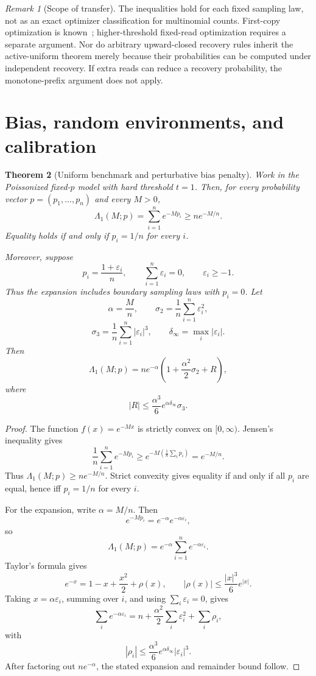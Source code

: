 \documentclass[11pt]{article}
\newtheorem{theorem}{Theorem}[section]
\theoremstyle{definition}
\theoremstyle{remark}
\newtheorem{remark}[theorem]{Remark}
\newcommand{\1}{\mathbf 1}
\begin{document}
\begin{remark}[Scope of transfer]
The inequalities hold for each fixed sampling law, not as an exact
optimizer classification for multinomial counts. First-copy
optimization is known~\cite{Anceaume2015}; higher-threshold fixed-read
optimization requires a separate argument. Nor do arbitrary
upward-closed recovery rules inherit the active-uniform theorem merely
because their probabilities can be computed under independent recovery.
If extra reads can reduce a recovery probability, the monotone-prefix
argument does not apply.
\end{remark}

\section{Bias, random environments, and calibration}
\label{sec:random-environments}
\begin{theorem}[Uniform benchmark and perturbative bias penalty]\label{thm:uniform-penalty}
Work in the Poissonized fixed-\(p\) model with hard threshold \(t=1\).  Then, for every probability vector \(p=(p_1,\ldots,p_n)\) and every \(M>0\),
\[
  \Lambda_1(M;p)=\sum_{i=1}^n e^{-Mp_i}
  \ge n e^{-M/n}.
\]
Equality holds if and only if \(p_i=1/n\) for every \(i\).

Moreover, suppose
\[
  p_i=\frac{1+\varepsilon_i}{n},
  \qquad \sum_{i=1}^n\varepsilon_i=0,
  \qquad \varepsilon_i\ge-1.
\]
Thus the expansion includes boundary sampling laws with \(p_i=0\).
Let
\[
  \alpha=\frac{M}{n},\qquad
  \sigma_2=\frac1n\sum_{i=1}^n\varepsilon_i^2,
\]
\[
  \sigma_3=\frac1n\sum_{i=1}^n|\varepsilon_i|^3,
  \qquad
  \delta_\infty=\max_i|\varepsilon_i|.
\]
Then
\[
  \Lambda_1(M;p)
  =n e^{-\alpha}\left(1+\frac{\alpha^2}{2}\sigma_2+R\right),
\]
where
\[
  |R|\le \frac{\alpha^3}{6}e^{\alpha\delta_\infty}\sigma_3.
\]
\end{theorem}

\begin{proof}
The function \(f(x)=e^{-Mx}\) is strictly convex on \([0,\infty)\).  Jensen's inequality gives
\[
  \frac1n\sum_{i=1}^n e^{-Mp_i}
  \ge e^{-M(\frac1n\sum_i p_i)}=e^{-M/n}.
\]
Thus \(\Lambda_1(M;p)\ge n e^{-M/n}\).  Strict convexity gives equality if and only if all \(p_i\) are equal, hence iff \(p_i=1/n\) for every \(i\).

For the expansion, write \(\alpha=M/n\).  Then
\[
  e^{-Mp_i}=e^{-\alpha}e^{-\alpha\varepsilon_i},
\]
so
\[
  \Lambda_1(M;p)=e^{-\alpha}\sum_{i=1}^n e^{-\alpha\varepsilon_i}.
\]
Taylor's formula gives
\[
  e^{-x}=1-x+\frac{x^2}{2}+\rho(x),
  \qquad |\rho(x)|\le \frac{|x|^3}{6}e^{|x|}.
\]
Taking \(x=\alpha\varepsilon_i\), summing over \(i\), and using \(\sum_i\varepsilon_i=0\), gives
\[
  \sum_i e^{-\alpha\varepsilon_i}
  =n+\frac{\alpha^2}{2}\sum_i\varepsilon_i^2+\sum_i\rho_i,
\]
with
\[
  |\rho_i|\le \frac{\alpha^3}{6}e^{\alpha\delta_\infty}|\varepsilon_i|^3.
\]
After factoring out \(n e^{-\alpha}\), the stated expansion and remainder bound follow.
\end{proof}
\end{document}
